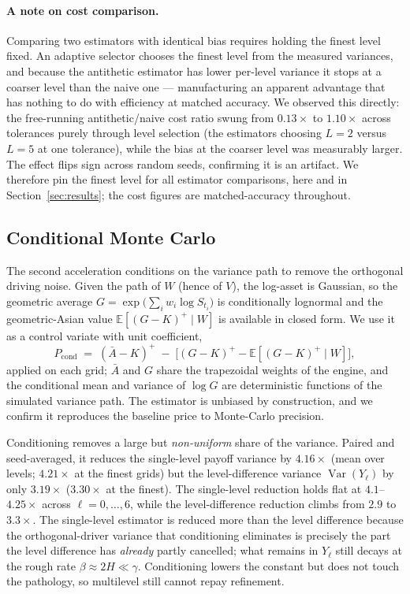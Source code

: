 \documentclass[11pt]{article}
\begin{document}
\paragraph{A note on cost comparison.} Comparing two estimators with identical bias requires
holding the finest level fixed. An adaptive selector chooses the finest level from the
measured variances, and because the antithetic estimator has lower per-level variance it
stops at a coarser level than the naive one --- manufacturing an apparent advantage that has
nothing to do with efficiency at matched accuracy. We observed this directly: the
free-running antithetic/naive cost ratio swung from $0.13\times$ to $1.10\times$ across
tolerances purely through level selection (the estimators choosing $L=2$ versus $L=5$ at one
tolerance), while the bias at the coarser level was measurably larger. The effect flips sign
across random seeds, confirming it is an artifact. We therefore pin the finest level for all
estimator comparisons, here and in Section~\ref{sec:results}; the cost figures are
matched-accuracy throughout.

\subsection{Conditional Monte Carlo}
\label{sec:conditional}

The second acceleration conditions on the variance path to remove the orthogonal driving
noise. Given the path of $W$ (hence of $V$), the log-asset is Gaussian, so the geometric
average $G=\exp\!\big(\sum_i w_i\log S_{t_i}\big)$ is conditionally lognormal and the
geometric-Asian value $\mathbb{E}[(G-K)^+\mid W]$ is available in closed form. We use it as
a control variate with unit coefficient,
\begin{equation}
P_{\mathrm{cond}} \;=\; (\bar A-K)^+ \;-\;
\big[(G-K)^+ - \mathbb{E}[(G-K)^+\mid W]\big],
\label{eq:condcv}
\end{equation}
applied on each grid; $\bar A$ and $G$ share the trapezoidal weights of the engine, and the
conditional mean and variance of $\log G$ are deterministic functions of the simulated
variance path. The estimator is unbiased by construction, and we confirm it reproduces the
baseline price to Monte-Carlo precision.

Conditioning removes a large but \emph{non-uniform} share of the variance. Paired and
seed-averaged, it reduces the single-level payoff variance by $4.16\times$ (mean over
levels; $4.21\times$ at the finest grids) but the level-difference variance
$\operatorname{Var}(Y_\ell)$ by only $3.19\times$ ($3.30\times$ at the finest). The
single-level reduction holds flat at $4.1$--$4.25\times$ across $\ell=0,\dots,6$, while the
level-difference reduction climbs from $2.9$ to $3.3\times$. The single-level estimator is
reduced more than the level difference because the orthogonal-driver variance that
conditioning eliminates is precisely the part the level difference has \emph{already} partly
cancelled; what remains in $Y_\ell$ still decays at the rough rate $\beta\approx2H\ll\gamma$.
Conditioning lowers the constant but does not touch the pathology, so multilevel still cannot
repay refinement.
\end{document}

